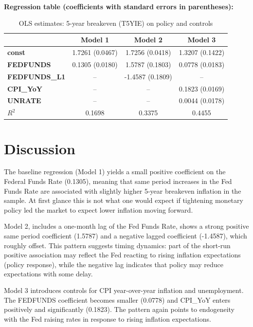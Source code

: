 \documentclass[11pt]{article}
\begin{document}
\vspace{6pt}
\noindent\textbf{Regression table (coefficients with standard errors in parentheses):}

\begin{table}[H]
\centering
\caption{OLS estimates: 5-year breakeven (T5YIE) on policy and controls}
\label{tab:results}
\begin{tabular}{lccc}
\toprule
 & \textbf{Model 1} & \textbf{Model 2} & \textbf{Model 3} \\
\midrule
\textbf{const} & 1.7261 (0.0467) & 1.7256 (0.0418) & 1.3207 (0.1422) \\
\textbf{FEDFUNDS} & 0.1305 (0.0180) & 1.5787 (0.1803) & 0.0778 (0.0183) \\
\textbf{FEDFUNDS\_L1} & -- & -1.4587 (0.1809) & -- \\
\textbf{CPI\_YoY} & -- & -- & 0.1823 (0.0169) \\
\textbf{UNRATE} & -- & -- & 0.0044 (0.0178) \\
\midrule
$R^2$ & 0.1698 & 0.3375 & 0.4455 \\
\bottomrule
\end{tabular}
\end{table}

\section{Discussion}
The baseline regression (Model 1) yields a small positive coefficient on the Federal Funds Rate (0.1305), meaning that same period increases in the Fed Funds Rate are associated with slightly higher 5-year breakeven inflation in the sample. At first glance this is not what one would expect if tightening monetary policy led the market to expect lower inflation moving forward.

Model 2, includes a one-month lag of the Fed Funds Rate, shows a strong positive same period coefficient (1.5787) and a negative lagged coefficient (-1.4587), which roughly offset. This pattern suggests timing dynamics: part of the short-run positive association may reflect the Fed reacting to rising inflation expectations (policy response), while the negative lag indicates that policy may reduce expectations with some delay.

Model 3 introduces controls for CPI year-over-year inflation and unemployment. The FEDFUNDS coefficient becomes smaller (0.0778) and CPI\_YoY enters positively and significantly (0.1823). The pattern again points to endogeneity with the Fed raising rates in response to rising inflation expectations.

\bigskip
\end{document}
